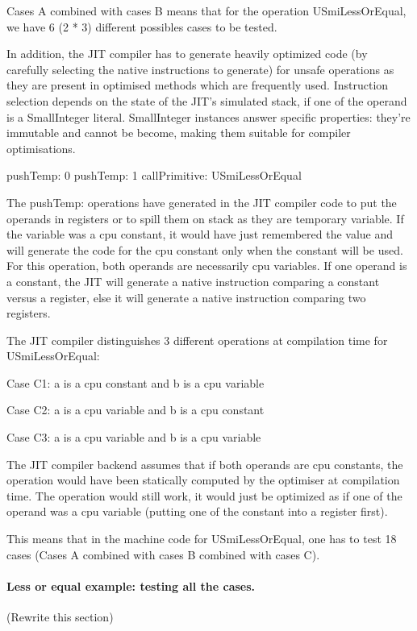 \documentclass[a4paper,12pt,twoside]{../includes/ThesisStyle}
\begin{document}
Cases A combined with cases B means that for the operation USmiLessOrEqual, we have 6 (2 * 3) different possibles cases to be tested.

In addition, the JIT compiler has to generate heavily optimized code (by carefully selecting the native instructions to generate) for unsafe operations as they are present in optimised methods which are frequently used. Instruction selection depends on the state of the JIT's simulated stack, \ie if one of the operand is a SmallInteger literal. SmallInteger instances answer specific properties: they're immutable and cannot be become, making them suitable for compiler optimisations.

pushTemp: 0
pushTemp: 1
callPrimitive: USmiLessOrEqual

The pushTemp: operations have generated in the JIT compiler code to put the operands in registers or to spill them on stack as they are temporary variable. If the variable was a cpu constant, it would have just remembered the value and will generate the code for the cpu constant only when the constant will be used. For this operation, both operands are necessarily cpu variables. If one operand is a constant, the JIT will generate a native instruction comparing a constant versus a register, else it will generate a native instruction comparing two registers.

The JIT compiler distinguishes 3 different operations at compilation time for USmiLessOrEqual:

Case C1: a is a cpu constant and b is a cpu variable

Case C2: a is a cpu variable and b is a cpu constant

Case C3: a is a cpu variable and b is a cpu variable

The JIT compiler backend assumes that if both operands are cpu constants, the operation would have been statically computed by the optimiser at compilation time. The operation would still work, it would just be optimized as if one of the operand was a cpu variable (putting one of the constant into a register first).

This means that in the machine code for USmiLessOrEqual, one has to test 18 cases (Cases A combined with cases B combined with cases C).

\paragraph{Less or equal example: testing all the cases.}
(Rewrite this section)
\end{document}

